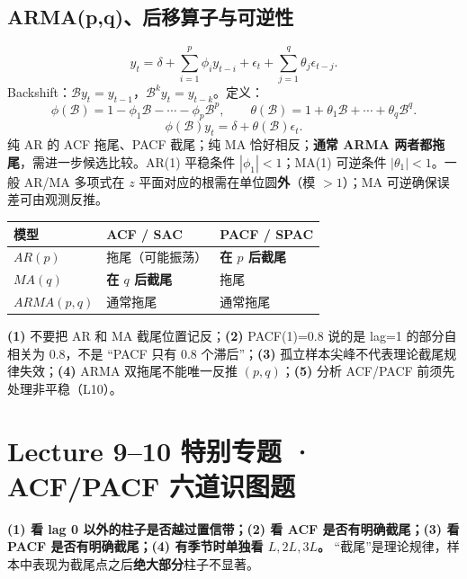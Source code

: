 \documentclass[UTF8,fontset=fandol,10.5pt,a4paper]{ctexart}
\newcommand{\eng}[1]{{\sffamily\color{navy}#1}}
\newcommand{\formula}[1]{\[\boxed{#1}\]}
\newcommand{\thick}{\renewcommand{\arraystretch}{1.18}}
\begin{document}
\subsection{ARMA(p,q)、后移算子与可逆性}
\[y_t=\delta+\sum_{i=1}^{p}\phi_i y_{t-i}+\epsilon_t+\sum_{j=1}^{q}\theta_j\epsilon_{t-j}.\]
\eng{Backshift}：$\mathcal B y_t=y_{t-1}$，$\mathcal B^k y_t=y_{t-k}$。定义：
\[\phi(\mathcal B)=1-\phi_1\mathcal B-\cdots-\phi_p\mathcal B^p,\qquad\theta(\mathcal B)=1+\theta_1\mathcal B+\cdots+\theta_q\mathcal B^q.\]
\formula{\phi(\mathcal B)y_t=\delta+\theta(\mathcal B)\epsilon_t.}
纯 AR 的 ACF 拖尾、PACF 截尾；纯 MA 恰好相反；\textbf{通常 ARMA 两者都拖尾}，需进一步候选比较。AR(1) 平稳条件 $|\phi_1|<1$；MA(1) 可逆条件 $|\theta_1|<1$。一般 AR/MA 多项式在 $z$ 平面对应的根需在单位圆\textbf{外}（模 $>1$）；MA 可逆确保误差可由观测反推。
\par\smallskip{}\par\smallskip
\begin{keybox}[title={Lecture 9 截尾/拖尾识别：背下整张表}]
\begin{center}\thick\begin{tabularx}{0.97\linewidth}{lXX}\toprule
模型 & ACF / SAC & PACF / SPAC \\ \midrule
$AR(p)$ & 拖尾（可能振荡） & \textbf{在 $p$ 后截尾} \\
$MA(q)$ & \textbf{在 $q$ 后截尾} & 拖尾 \\
$ARMA(p,q)$ & 通常拖尾 & 通常拖尾 \\
\bottomrule\end{tabularx}\end{center}
\end{keybox}
\begin{pitbox}
\textbf{(1)} 不要把 AR 和 MA 截尾位置记反；\textbf{(2)} PACF(1)=0.8 说的是 lag=1 的部分自相关为 0.8，不是 “PACF 只有 0.8 个滞后”；\textbf{(3)} 孤立样本尖峰不代表理论截尾规律失效；\textbf{(4)} ARMA 双拖尾不能唯一反推 $(p,q)$；\textbf{(5)} 分析 ACF/PACF 前须先处理非平稳（L10）。
\end{pitbox}
\clearpage
\section{Lecture 9--10 特别专题 · ACF/PACF 六道识图题}
\begin{keybox}[title={看图四步，不需要背六张图}]
\textbf{(1) 看 lag 0 以外的柱子是否越过置信带；(2) 看 ACF 是否有明确截尾；(3) 看 PACF 是否有明确截尾；(4) 有季节时单独看 $L,2L,3L$。} “截尾”是理论规律，样本中表现为截尾点之后\textbf{绝大部分}柱子不显著。
\end{keybox}
\end{document}
